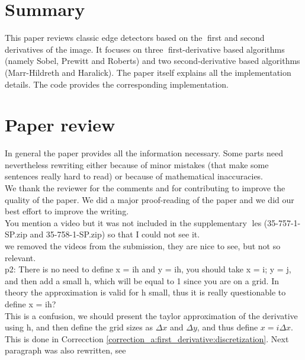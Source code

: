 \documentclass[a4paper,10pt]{report}
\begin{document}
\section{Summary}

\que This paper reviews classic edge detectors based on the first and second derivatives of the image. It focuses
on three first-derivative based algorithms (namely Sobel, Prewitt and Roberts) and two second-derivative
based algorithms (Marr-Hildreth and Haralick). The paper itself explains all the implementation details.
The code provides the corresponding implementation.\\

\section{Paper review}

\que In general the paper provides all the information necessary. Some parts need nevertheless rewriting either because of minor mistakes (that make some sentences really hard to read) or because of mathematical inaccuracies.\\

\ans We thank the reviewer for the comments and for contributing to improve the quality of the paper. We did a major proof-reading of the paper and we did our best effort to improve the writing.\\

\que You mention a video but it was not included in the supplementary les (35-757-1-SP.zip and 35-758-1-SP.zip) so that I could not see it.\\

\ans we removed the videos from the submission, they are nice to see, but not so relevant.\\

\que p2: There is no need to define x = ih and y = ih, you should take x = i; y = j, and then add a small h, which will be equal to 1 since you are on a grid. In theory the approximation is valid for h small, thus it is really questionable to define x = ih? \\

\ans This is a confusion, we should present the taylor approximation of the derivative using h, and then define the grid sizes as $\Delta x$ and $\Delta y$, and thus define $x=i\Delta x$. This is done in Correcction \ref{correction_a:first_derivative:discretization}. Next paragraph was also rewritten, see \\
\end{document}
